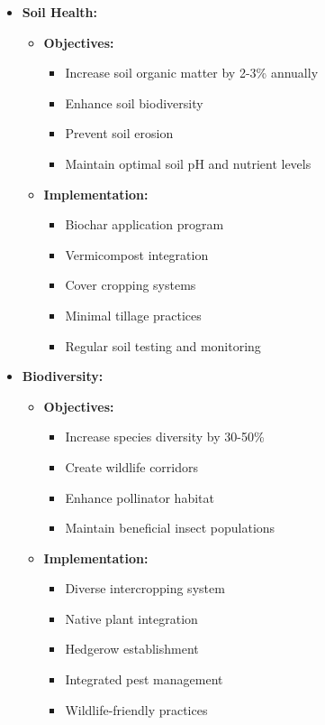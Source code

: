 \begin{itemize}
    \item \textbf{Soil Health:}
    \begin{itemize}
        \item \textbf{Objectives:}
        \begin{itemize}
            \item Increase soil organic matter by 2-3\% annually
            \item Enhance soil biodiversity
            \item Prevent soil erosion
            \item Maintain optimal soil pH and nutrient levels
        \end{itemize}
        \item \textbf{Implementation:}
        \begin{itemize}
            \item Biochar application program
            \item Vermicompost integration
            \item Cover cropping systems
            \item Minimal tillage practices
            \item Regular soil testing and monitoring
        \end{itemize}
    \end{itemize}
    
    \item \textbf{Biodiversity:}
    \begin{itemize}
        \item \textbf{Objectives:}
        \begin{itemize}
            \item Increase species diversity by 30-50\%
            \item Create wildlife corridors
            \item Enhance pollinator habitat
            \item Maintain beneficial insect populations
        \end{itemize}
        \item \textbf{Implementation:}
        \begin{itemize}
            \item Diverse intercropping system
            \item Native plant integration
            \item Hedgerow establishment
            \item Integrated pest management
            \item Wildlife-friendly practices
        \end{itemize}
    \end{itemize}
    

\end{itemize}
